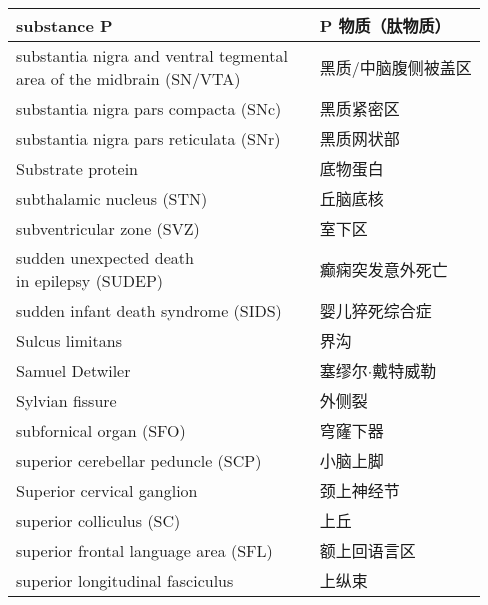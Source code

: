 \begin{longtable}{lll}
	\midrule
	substance P   && P 物质（肽物质） \\
	
	\midrule
	\makecell[l]{substantia nigra and ventral tegmental \\area of the midbrain (SN/VTA)}   && 黑质/中脑腹侧被盖区 \\
	
	\midrule
	substantia nigra pars compacta (SNc)  && 黑质紧密区 \\
	
	\midrule
	substantia nigra pars reticulata (SNr)  && 黑质网状部 \\
	
	\midrule
	Substrate protein  && 底物蛋白 \\
	
	\midrule
	subthalamic nucleus (STN)   && 丘脑底核 \\
	
	\midrule
	subventricular zone (SVZ)   && 室下区 \\
	
	\midrule
	\makecell[l]{sudden unexpected death \\in epilepsy (SUDEP)}  && 癫痫突发意外死亡 \\
	
	\midrule
	sudden infant death syndrome (SIDS)  && 婴儿猝死综合症 \\
	
	\midrule
	Sulcus limitans   && 界沟 \\
	
	\midrule
	Samuel Detwiler   && 塞缪尔$\cdot$戴特威勒 \\
	
	\midrule
	Sylvian fissure   && 外侧裂 \\
	
	\midrule
	subfornical organ (SFO)  && 穹窿下器 \\
	
	\midrule
	superior cerebellar peduncle (SCP)  && 小脑上脚 \\
	
	\midrule
	Superior cervical ganglion   && 颈上神经节 \\
	
	\midrule
	superior colliculus (SC)  && 上丘 \\
	
	\midrule
	superior frontal language area (SFL) && 额上回语言区 \\
	
	\midrule
	superior longitudinal fasciculus   && 上纵束 \\
	

\end{longtable}
